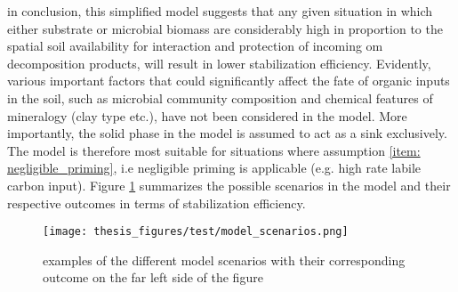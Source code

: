 	 in conclusion, this simplified model suggests that any given situation in which either substrate or microbial biomass are considerably high in proportion to the spatial soil availability for interaction and protection of incoming \gls{om} decomposition products, will result in lower stabilization efficiency. Evidently, various important factors that could significantly affect the fate of organic inputs in the soil, such as microbial community composition and  chemical features of mineralogy (clay type etc.), have not been considered in the model. More importantly, the solid phase in the model is assumed to act as a sink exclusively. The model is therefore most suitable for situations where assumption \ref{item: negligible_priming}, i.e negligible priming is applicable (e.g. high rate labile carbon input). Figure \ref{fig:stabilization_model_scenarios} summarizes the possible scenarios in the model and their respective outcomes in terms of stabilization efficiency.\\

	 \begin{figure}[H]
	 	\centering
	 	\texttt{[image: thesis\_figures/test/model\_scenarios.png]}
	 	\caption{examples of the different model scenarios with their corresponding outcome on the far left side of the figure}
	 	\label{fig:stabilization_model_scenarios}
	 \end{figure}

